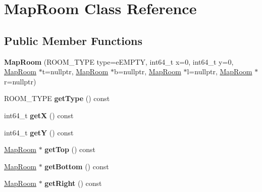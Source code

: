 \hypertarget{class_map_room}{}\section{Map\+Room Class Reference}
\label{class_map_room}
\subsection*{Public Member Functions}
\begin{DoxyCompactItemize}
\item 
\hypertarget{class_map_room_a15b09f173da64b1bfa8a029ca600c541}{}{\bfseries Map\+Room} (R\+O\+O\+M\+\_\+\+T\+Y\+P\+E type=e\+E\+M\+P\+T\+Y, int64\+\_\+t x=0, int64\+\_\+t y=0, \hyperlink{class_map_room}{Map\+Room} $\ast$t=nullptr, \hyperlink{class_map_room}{Map\+Room} $\ast$b=nullptr, \hyperlink{class_map_room}{Map\+Room} $\ast$l=nullptr, \hyperlink{class_map_room}{Map\+Room} $\ast$r=nullptr)\label{class_map_room_a15b09f173da64b1bfa8a029ca600c541}

\item 
\hypertarget{class_map_room_a1869c9ec95962a9cc72eea1dff46fe14}{}R\+O\+O\+M\+\_\+\+T\+Y\+P\+E {\bfseries get\+Type} () const \label{class_map_room_a1869c9ec95962a9cc72eea1dff46fe14}

\item 
\hypertarget{class_map_room_aff8bd7d48a3db0eabb39514395c5bc1b}{}int64\+\_\+t {\bfseries get\+X} () const \label{class_map_room_aff8bd7d48a3db0eabb39514395c5bc1b}

\item 
\hypertarget{class_map_room_a8e82f06ca953c5a2f8ed17f53fb085b4}{}int64\+\_\+t {\bfseries get\+Y} () const \label{class_map_room_a8e82f06ca953c5a2f8ed17f53fb085b4}

\item 
\hypertarget{class_map_room_a826e3f3a4b0475163ecaa7e10afbf954}{}\hyperlink{class_map_room}{Map\+Room} $\ast$ {\bfseries get\+Top} () const \label{class_map_room_a826e3f3a4b0475163ecaa7e10afbf954}

\item 
\hypertarget{class_map_room_a88e2963f0e2e212d5a8220ee3a6f9822}{}\hyperlink{class_map_room}{Map\+Room} $\ast$ {\bfseries get\+Bottom} () const \label{class_map_room_a88e2963f0e2e212d5a8220ee3a6f9822}

\item 
\hypertarget{class_map_room_a613d3f3fda462cc995f0a6bcf8118009}{}\hyperlink{class_map_room}{Map\+Room} $\ast$ {\bfseries get\+Right} () const \label{class_map_room_a613d3f3fda462cc995f0a6bcf8118009}


\end{DoxyCompactItemize}
